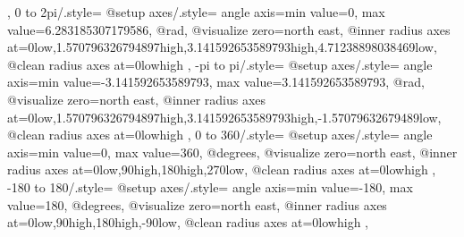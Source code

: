 {{{{      }
    }
  },
  0 to 2pi/.style={
    @setup axes/.style={
      angle axis={min value=0, max value=6.283185307179586},
      @rad,
      @visualize zero=north east,
      @inner radius axes at={{0}{low},{1.570796326794897}{high},{3.141592653589793}{high},{4.71238898038469}{low}},
      @clean radius axes at={{0}{low}{high}{}{}}
    }
  },
  -pi to pi/.style={
    @setup axes/.style={
      angle axis={min value=-3.141592653589793, max value=3.141592653589793},
      @rad,
      @visualize zero=north east,
      @inner radius axes at={{0}{low},{1.570796326794897}{high},{3.141592653589793}{high},{-1.57079632679489}{low}},
      @clean radius axes at={{0}{low}{high}{}{}}
    }
  },
  0 to 360/.style={
    @setup axes/.style={
      angle axis={min value=0, max value=360},
      @degrees,
      @visualize zero=north east,
      @inner radius axes at={{0}{low},{90}{high},{180}{high},{270}{low}},
      @clean radius axes at={{0}{low}{high}{}{}}
    }
  },
  -180 to 180/.style={
    @setup axes/.style={
      angle axis={min value=-180, max value=180},
      @degrees,
      @visualize zero=north east,
      @inner radius axes at={{0}{low},{90}{high},{180}{high},{-90}{low}},
      @clean radius axes at={{0}{low}{high}{}{}}
    }
  },
}




%
%





\endinput
